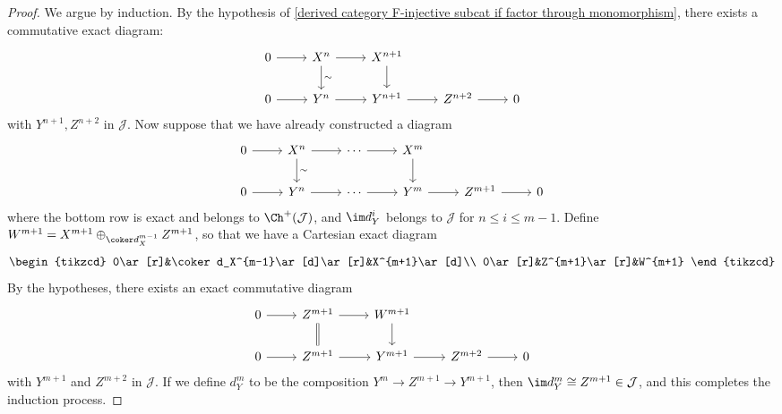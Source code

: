 \begin{proof}
We argue by induction. By the hypothesis of \cref{derived category F-injective subcat if factor through monomorphism}, there exists a commutative
exact diagram:
\[\begin{tikzcd}
0\ar[r]&X^n\ar[r]\ar[d,"\sim"]&X^{n+1}\ar[d]\\
0\ar[r]&Y^n\ar[r]&Y^{n+1}\ar[r]&Z^{n+2}\ar[r]&0
\end{tikzcd}\]
with $Y^{n+1},Z^{n+2}$ in $\mathcal{J}$. Now suppose that we have already constructed a diagram
\[\begin{tikzcd}
0\ar[r]&X^n\ar[r]\ar[d,"\sim"]&\cdots\ar[r]&X^m\ar[d]\\
0\ar[r]&Y^n\ar[r]&\cdots\ar[r]&Y^m\ar[r]&Z^{m+1}\ar[r]&0
\end{tikzcd}\]
where the bottom row is exact and belongs to $\Ch^+(\mathcal{J})$, and $\im d_Y^i$ belongs to $\mathcal{J}$ for $n\leq i\leq m-1$. Define $W^{m+1}=X^{m+1}\oplus_{\coker d_X^{m-1}}Z^{m+1}$, so that we have a Cartesian exact diagram
\[\begin{tikzcd}
0\ar[r]&\coker d_X^{m-1}\ar[d]\ar[r]&X^{m+1}\ar[d]\\
0\ar[r]&Z^{m+1}\ar[r]&W^{m+1}
\end{tikzcd}\]
By the hypotheses, there exists an exact commutative diagram
\[\begin{tikzcd}
0\ar[r]&Z^{m+1}\ar[d,equal]\ar[r]&W^{m+1}\ar[d]\\
0\ar[r]&Z^{m+1}\ar[r]&Y^{m+1}\ar[r]&Z^{m+2}\ar[r]&0
\end{tikzcd}\]
with $Y^{m+1}$ and $Z^{m+2}$ in $\mathcal{J}$. If we define $d^m_Y$ to be the composition $Y^m\to Z^{m+1}\to Y^{m+1}$, then $\im d^m_Y\cong Z^{m+1}\in\mathcal{J}$, and this completes the induction process.
\end{proof}

